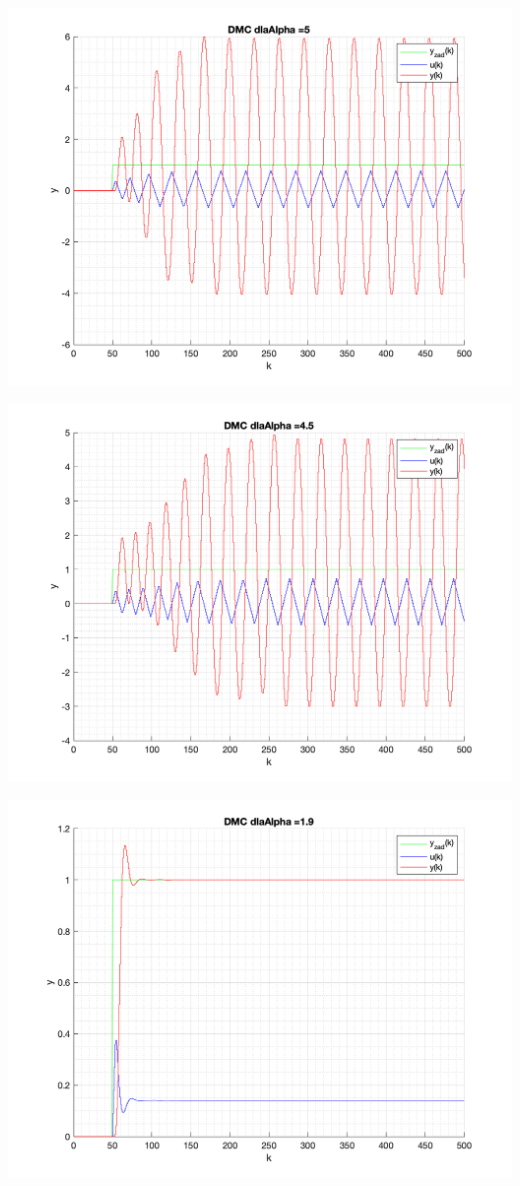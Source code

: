 \documentclass[a4paper, 11pt]{article}
\begin{document}
\begin{enumerate}
 \includegraphics[width=\linewidth]{./ModelsDodatkowe_Alpha/P4_DMC_Alpha_5_png.png} 
 
 \includegraphics[width=\linewidth]{./ModelsDodatkowe_Alpha/P4_DMC_Alpha_4_5_png.png} 
 
 \includegraphics[width=\linewidth]{./ModelsDodatkowe_Alpha/P4_DMC_Alpha_1_9_png.png} 
 

\end{enumerate}
\end{document}
